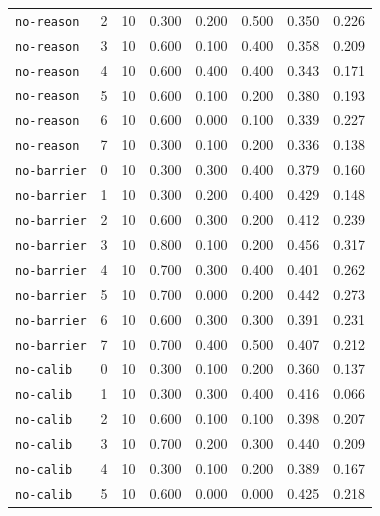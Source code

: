 \documentclass{article}
\begin{document}
\begin{center}
{\begin{tabular}{lllccccc}
\texttt{no-reason} & 2 & 10 & 0.300 & 0.200 & 0.500 & 0.350 & 0.226 \\
\texttt{no-reason} & 3 & 10 & 0.600 & 0.100 & 0.400 & 0.358 & 0.209 \\
\texttt{no-reason} & 4 & 10 & 0.600 & 0.400 & 0.400 & 0.343 & 0.171 \\
\texttt{no-reason} & 5 & 10 & 0.600 & 0.100 & 0.200 & 0.380 & 0.193 \\
\texttt{no-reason} & 6 & 10 & 0.600 & 0.000 & 0.100 & 0.339 & 0.227 \\
\texttt{no-reason} & 7 & 10 & 0.300 & 0.100 & 0.200 & 0.336 & 0.138 \\
\texttt{no-barrier} & 0 & 10 & 0.300 & 0.300 & 0.400 & 0.379 & 0.160 \\
\texttt{no-barrier} & 1 & 10 & 0.300 & 0.200 & 0.400 & 0.429 & 0.148 \\
\texttt{no-barrier} & 2 & 10 & 0.600 & 0.300 & 0.200 & 0.412 & 0.239 \\
\texttt{no-barrier} & 3 & 10 & 0.800 & 0.100 & 0.200 & 0.456 & 0.317 \\
\texttt{no-barrier} & 4 & 10 & 0.700 & 0.300 & 0.400 & 0.401 & 0.262 \\
\texttt{no-barrier} & 5 & 10 & 0.700 & 0.000 & 0.200 & 0.442 & 0.273 \\
\texttt{no-barrier} & 6 & 10 & 0.600 & 0.300 & 0.300 & 0.391 & 0.231 \\
\texttt{no-barrier} & 7 & 10 & 0.700 & 0.400 & 0.500 & 0.407 & 0.212 \\
\texttt{no-calib} & 0 & 10 & 0.300 & 0.100 & 0.200 & 0.360 & 0.137 \\
\texttt{no-calib} & 1 & 10 & 0.300 & 0.300 & 0.400 & 0.416 & 0.066 \\
\texttt{no-calib} & 2 & 10 & 0.600 & 0.100 & 0.100 & 0.398 & 0.207 \\
\texttt{no-calib} & 3 & 10 & 0.700 & 0.200 & 0.300 & 0.440 & 0.209 \\
\texttt{no-calib} & 4 & 10 & 0.300 & 0.100 & 0.200 & 0.389 & 0.167 \\
\texttt{no-calib} & 5 & 10 & 0.600 & 0.000 & 0.000 & 0.425 & 0.218 \\
\bottomrule
\end{tabular}%
}
\end{center}
\end{document}
